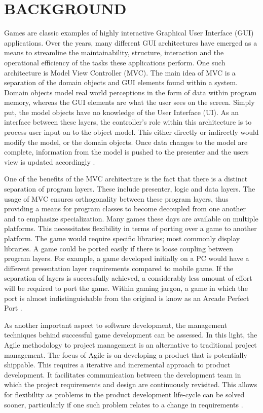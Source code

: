 \documentclass[10pt,twocolumn]{witseiepaper}
\begin{document}
%
\section{BACKGROUND}
\label{sec:Background} %
Games are classic examples of highly interactive Graphical User Interface (GUI) applications. Over the years, many different GUI architectures have emerged as a means to streamline the maintainability, structure, interaction and the operational efficiency of the tasks these applications perform. One such architecture is Model View Controller (MVC). The main idea of MVC is a separation of the domain objects and GUI elements found within a system. Domain objects model real world perceptions in the form of data within program memory, whereas the GUI elements are what the user sees on the screen. Simply put, the model objects have no knowledge of the User Interface (UI). As an interface between these layers, the controller's role within this architecture is to process user input on to the object model. This either directly or indirectly would modify the model, or the domain objects. Once data changes to the model are complete, information from the model is pushed to the presenter and the users view is updated accordingly \cite{m-fowler}.

One of the benefits of the MVC architecture is the fact that there is a distinct separation of program layers. These include presenter, logic and data layers. The usage of MVC ensures orthogonality between these program layers, thus  providing a means for program classes to become decoupled from one another and to emphasize specialization. Many games these days are available on multiple platforms. This necessitates flexibility in terms of porting over a game to another platform. The game would require specific libraries; most commonly display libraries. A game could be ported easily if there is loose coupling between program layers. For example, a game developed initially on a PC would have a different presentation layer requirements compared to mobile game. If the separation of layers is successfully achieved, a considerably less amount of effort will be required to port the game. Within gaming jargon, a game in which the port is almost indistinguishable from the original is know as an Arcade Perfect Port \cite{tv-tropes}.

As another important aspect to software development, the management techniques behind successful game development can be assessed. In this light, the Agile methodology to project management is an alternative to traditional project management. The focus of Agile is on developing a product that is potentially shippable. This requires a iterative and incremental approach to product development. It facilitates communication between the development team in which the project requirements and design are continuously revisited. This allows for flexibility as problems in the product development life-cycle can be solved sooner, particularly if one such problem relates to a change in requirements \cite{agile}.
\end{document}
